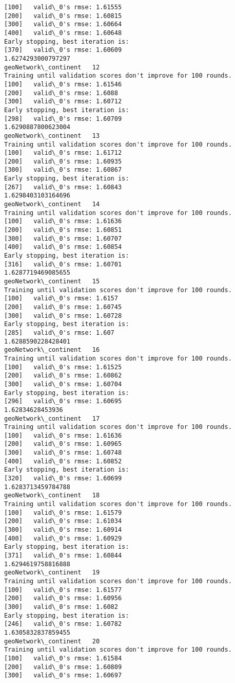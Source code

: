 \documentclass[11pt]{article}
\begin{document}
\begin{Verbatim}[commandchars=\\\{\}]
[100]	valid\_0's rmse: 1.61555
[200]	valid\_0's rmse: 1.60815
[300]	valid\_0's rmse: 1.60664
[400]	valid\_0's rmse: 1.60648
Early stopping, best iteration is:
[370]	valid\_0's rmse: 1.60609
1.6274293000797297
geoNetwork\_continent   12
Training until validation scores don't improve for 100 rounds.
[100]	valid\_0's rmse: 1.61546
[200]	valid\_0's rmse: 1.6088
[300]	valid\_0's rmse: 1.60712
Early stopping, best iteration is:
[298]	valid\_0's rmse: 1.60709
1.6290887800623004
geoNetwork\_continent   13
Training until validation scores don't improve for 100 rounds.
[100]	valid\_0's rmse: 1.61712
[200]	valid\_0's rmse: 1.60935
[300]	valid\_0's rmse: 1.60867
Early stopping, best iteration is:
[267]	valid\_0's rmse: 1.60843
1.6298403103164696
geoNetwork\_continent   14
Training until validation scores don't improve for 100 rounds.
[100]	valid\_0's rmse: 1.61636
[200]	valid\_0's rmse: 1.60851
[300]	valid\_0's rmse: 1.60707
[400]	valid\_0's rmse: 1.60854
Early stopping, best iteration is:
[316]	valid\_0's rmse: 1.60701
1.6287719469085655
geoNetwork\_continent   15
Training until validation scores don't improve for 100 rounds.
[100]	valid\_0's rmse: 1.6157
[200]	valid\_0's rmse: 1.60745
[300]	valid\_0's rmse: 1.60728
Early stopping, best iteration is:
[285]	valid\_0's rmse: 1.607
1.6288590228428401
geoNetwork\_continent   16
Training until validation scores don't improve for 100 rounds.
[100]	valid\_0's rmse: 1.61525
[200]	valid\_0's rmse: 1.60862
[300]	valid\_0's rmse: 1.60704
Early stopping, best iteration is:
[296]	valid\_0's rmse: 1.60695
1.62834628453936
geoNetwork\_continent   17
Training until validation scores don't improve for 100 rounds.
[100]	valid\_0's rmse: 1.61636
[200]	valid\_0's rmse: 1.60965
[300]	valid\_0's rmse: 1.60748
[400]	valid\_0's rmse: 1.60852
Early stopping, best iteration is:
[320]	valid\_0's rmse: 1.60699
1.6283713459784788
geoNetwork\_continent   18
Training until validation scores don't improve for 100 rounds.
[100]	valid\_0's rmse: 1.61579
[200]	valid\_0's rmse: 1.61034
[300]	valid\_0's rmse: 1.60914
[400]	valid\_0's rmse: 1.60929
Early stopping, best iteration is:
[371]	valid\_0's rmse: 1.60844
1.6294619758816888
geoNetwork\_continent   19
Training until validation scores don't improve for 100 rounds.
[100]	valid\_0's rmse: 1.61577
[200]	valid\_0's rmse: 1.60956
[300]	valid\_0's rmse: 1.6082
Early stopping, best iteration is:
[246]	valid\_0's rmse: 1.60782
1.6305832837859455
geoNetwork\_continent   20
Training until validation scores don't improve for 100 rounds.
[100]	valid\_0's rmse: 1.61584
[200]	valid\_0's rmse: 1.60809
[300]	valid\_0's rmse: 1.60697

\end{Verbatim}
\end{document}
